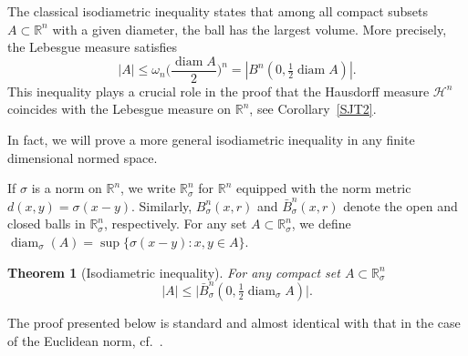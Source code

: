 \documentclass[12pt,leqno]{amsart}
\newtheorem{theorem}{Theorem}
\theoremstyle{definition}
\newcommand{\bbbr}{\mathbb R}
\def\diam{\operatorname{diam}}
\def\H{{\mathcal H}}
\numberwithin{theorem}{section} \numberwithin{equation}{section}
\begin{document}
The classical isodiametric inequality states that among all compact subsets $A\subset \bbbr^n$ with a given diameter, the ball has the largest volume. More precisely, the Lebesgue measure satisfies
$$
|A|\leq \omega_n\Big(\frac{\diam A}{2}\Big)^n=|B^n(0,\tfrac{1}{2}\diam A)|.
$$
This inequality plays a crucial role in the proof that the Hausdorff measure $\H^n$ coincides with the Lebesgue measure on $\bbbr^n$, see Corollary~\ref{SJT2}.

In fact, we will prove a more general isodiametric inequality in any finite dimensional normed space.

If $\sigma$ is a norm on $\bbbr^n$, we write $\bbbr^n_\sigma$ for $\bbbr^n$ equipped with the norm metric
$d(x,y)=\sigma(x-y)$.
Similarly, $B^n_\sigma(x,r)$ and $\bar{B}^n_\sigma(x,r)$ denote the open and closed balls in $\bbbr^n_\sigma$, respectively. For any set $A\subset \bbbr^n_\sigma$, we define
$\diam_\sigma(A)=\sup\{\sigma(x-y):x,y\in A\}$.
\begin{theorem}[Isodiametric inequality]
\label{AT3}
For any compact set $A\subset\bbbr^n_\sigma$
\begin{equation}
\label{eq:isod}
|A|\leq \big|\bar{B}^n_\sigma(0,\tfrac{1}{2}\diam_\sigma A)\big|.
\end{equation}
\end{theorem}
The proof presented below is standard and almost identical with that in the case of the Euclidean norm, cf.~\cite[Theorem 11.2.1]{buragoz}.
\end{document}
